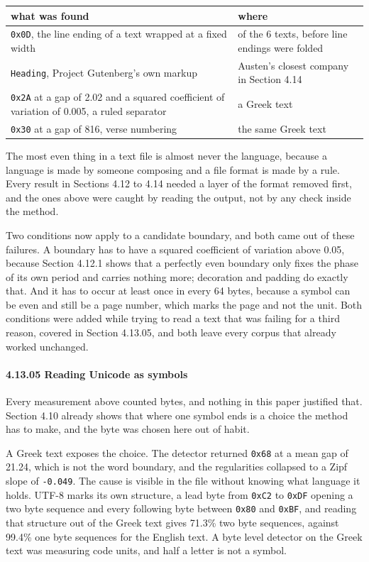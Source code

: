 \tiny
\setlength{\tabcolsep}{2pt}
\begin{longtable}{@{}>{\raggedright\arraybackslash}p{}>{\raggedright\arraybackslash}p{}@{}}
\toprule
what was found & where \\
\midrule
\texttt{0x0D}, the line ending of a text wrapped at a fixed width & 5 of the 6 texts, before line endings were folded \\
\texttt{Heading}, Project Gutenberg's own markup & Austen's closest company in Section 4.14 \\
\texttt{0x2A} at a gap of 2.02 and a squared coefficient of variation of 0.005, a ruled separator & a Greek text \\
\texttt{0x30} at a gap of 816, verse numbering & the same Greek text \\
\bottomrule
\end{longtable}
\normalsize

The most even thing in a text file is almost never the language, because a language is made by someone composing and a file format is made by a rule. Every result in Sections 4.12 to 4.14 needed a layer of the format removed first, and the ones above were caught by reading the output, not by any check inside the method.

Two conditions now apply to a candidate boundary, and both came out of these failures. A boundary has to have a squared coefficient of variation above 0.05, because Section 4.12.1 shows that a perfectly even boundary only fixes the phase of its own period and carries nothing more; decoration and padding do exactly that. And it has to occur at least once in every 64 bytes, because a symbol can be even and still be a page number, which marks the page and not the unit. Both conditions were added while trying to read a text that was failing for a third reason, covered in Section 4.13.05, and both leave every corpus that already worked unchanged.

\paragraph{4.13.05 Reading Unicode as symbols}

Every measurement above counted bytes, and nothing in this paper justified that. Section 4.10 already shows that where one symbol ends is a choice the method has to make, and the byte was chosen here out of habit.

A Greek text exposes the choice. The detector returned \texttt{0x68} at a mean gap of 21.24, which is not the word boundary, and the regularities collapsed to a Zipf slope of \texttt{-\allowbreak{}0.\allowbreak{}049}. The cause is visible in the file without knowing what language it holds. UTF-8 marks its own structure, a lead byte from \texttt{0x\allowbreak{}C2} to \texttt{0x\allowbreak{}DF} opening a two byte sequence and every following byte between \texttt{0x80} and \texttt{0x\allowbreak{}BF}, and reading that structure out of the Greek text gives 71.3\% two byte sequences, against 99.4\% one byte sequences for the English text. A byte level detector on the Greek text was measuring code units, and half a letter is not a symbol.

